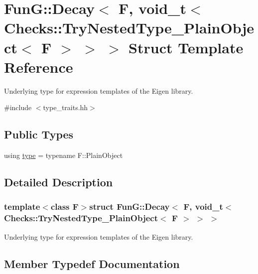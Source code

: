 \hypertarget{structFunG_1_1Decay_3_01F_00_01void__t_3_01Checks_1_1TryNestedType__PlainObject_3_01F_01_4_01_4_01_4}{}\section{Fun\+G\+:\+:Decay$<$ F, void\+\_\+t$<$ Checks\+:\+:Try\+Nested\+Type\+\_\+\+Plain\+Object$<$ F $>$ $>$ $>$ Struct Template Reference}
\label{structFunG_1_1Decay_3_01F_00_01void__t_3_01Checks_1_1TryNestedType__PlainObject_3_01F_01_4_01_4_01_4}


Underlying type for expression templates of the Eigen library.  




{\ttfamily \#include $<$type\+\_\+traits.\+hh$>$}

\subsection*{Public Types}
\begin{DoxyCompactItemize}
\item 
using \hyperlink{structFunG_1_1Decay_3_01F_00_01void__t_3_01Checks_1_1TryNestedType__PlainObject_3_01F_01_4_01_4_01_4_aaf19af34cb1c06b71ea99737d9375f52}{type} = typename F\+::\+Plain\+Object
\end{DoxyCompactItemize}


\subsection{Detailed Description}
\subsubsection*{template$<$class F$>$struct Fun\+G\+::\+Decay$<$ F, void\+\_\+t$<$ Checks\+::\+Try\+Nested\+Type\+\_\+\+Plain\+Object$<$ F $>$ $>$ $>$}

Underlying type for expression templates of the Eigen library. 

\subsection{Member Typedef Documentation}
\hypertarget{structFunG_1_1Decay_3_01F_00_01void__t_3_01Checks_1_1TryNestedType__PlainObject_3_01F_01_4_01_4_01_4_aaf19af34cb1c06b71ea99737d9375f52}{}
